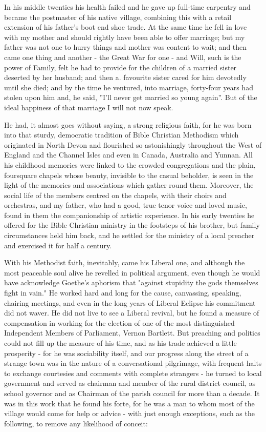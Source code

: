 In his middle twenties his health failed and he gave up full-time carpentry and became the postmaster of his native village, combining this with a retail extension of his father’s boot end shoe trade. At the same time he fell in love with my mother and should rightly have been able to offer marriage; but my father was not one to hurry things and mother was content to wait; and then came one thing and another - the Great War for one - and Will, such is the power of Family, felt he had to provide for the children of a married sister deserted by her husband; and then a. favourite sister cared for him devotedly until she died; and by the time he ventured, into marriage, forty-four years had stolen upon him and, he said, ”I’ll never get married so young again”. But of the ideal happiness of that marriage I will not now speak.

He had, it almost goes without saying, a strong religious faith, for he was born into that sturdy, democratic tradition of Bible Christian Methodism which originated in North Devon and flourished so astonishingly throughout the West of England and the Channel Isles and even in Canada, Australia and Yunnan. All his childhood memories were linked to the crowded congregations and the plain, foursquare chapels whose beauty, invisible to the casual beholder, is seen in the light of the memories and associations which gather round them. Moreover, the social life of the members centred on the chapels, with their choirs and orchestras, and my father, who had a good, true tenor voice and loved music, found in them the companionship of artistic experience. In his early twenties he offered for the Bible Christian ministry in the footsteps of his brother, but family circumstances held him back, and he settled for the ministry of a local preacher and exercised it for half a century.


With his Methodist faith, inevitably, came his Liberal one, and although the most peaceable soul alive he revelled in political argument, even though he would have acknowledge Goethe’s aphorism that "against stupidity the gods themselves fight in vain." He worked hard and long for the cause, canvassing, speaking, chairing meetings, and even in the long years of Liberal Eclipse his commitment did not waver. He did not live to see a Liberal revival, but he found a measure of compensation in working for the election of one of the most distinguished Independent Members of Parliament, Vernon Bartlett. But preaching and politics could not fill up the measure of his time, and as his trade achieved a little prosperity - for he was sociability itself, and our progress along the street of a strange town was in the nature of a conversational pilgrimage, with frequent halts to exchange courtesies and comments with complete strangers - he turned to local government and served as chairman and member of the rural district council, as school governor and as Chairman of the parish council for more than a decade. It was in this work that he found his forte, for he was a man to whom most of the village would come for help or advice - with just enough exceptions, such as the following, to remove any likelihood of conceit:

